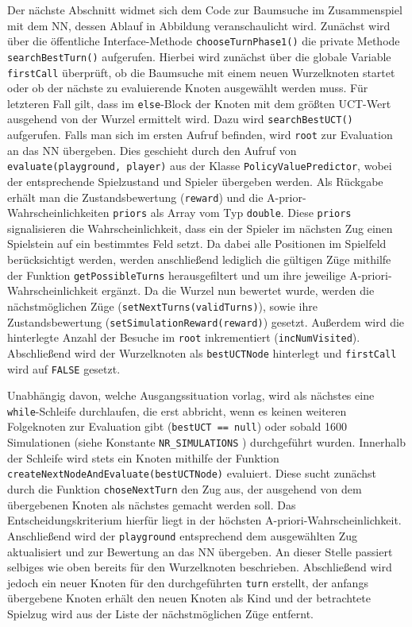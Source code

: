\documentclass[12pt,a4paper]{article}
\begin{document}
Der nächste Abschnitt widmet sich dem Code zur Baumsuche im Zusammenspiel mit dem NN, dessen Ablauf in Abbildung veranschaulicht wird. Zunächst wird über die öffentliche Interface-Methode \texttt{chooseTurnPhase1()} die private Methode \texttt{searchBestTurn()} aufgerufen. Hierbei wird zunächst über die globale Variable \texttt{firstCall} überprüft, ob die Baumsuche mit einem neuen Wurzelknoten startet oder ob der nächste zu evaluierende Knoten ausgewählt werden muss. Für letzteren Fall gilt, dass im \texttt{else}-Block der Knoten mit dem größten UCT-Wert ausgehend von der Wurzel ermittelt wird. Dazu wird \texttt{searchBestUCT()} aufgerufen. Falls man sich im ersten Aufruf befinden, wird \texttt{root} zur Evaluation an das NN übergeben. Dies geschieht durch den Aufruf von \texttt{evaluate(playground, player)} aus der Klasse \texttt{PolicyValuePredictor}, wobei der entsprechende Spielzustand und Spieler übergeben werden. Als Rückgabe erhält man die Zustandsbewertung (\texttt{reward}) und die A-prior-Wahrscheinlichkeiten \texttt{priors} als Array vom Typ \texttt{double}. Diese \texttt{priors} signalisieren die Wahrscheinlichkeit, dass ein der Spieler im nächsten Zug einen Spielstein auf ein bestimmtes Feld setzt. Da dabei alle Positionen im Spielfeld berücksichtigt werden, werden anschließend lediglich die gültigen Züge mithilfe der Funktion \texttt{getPossibleTurns} herausgefiltert und um ihre jeweilige A-priori-Wahrscheinlichkeit ergänzt. Da die Wurzel nun bewertet wurde, werden die nächstmöglichen Züge (\texttt{setNextTurns(validTurns)}), sowie ihre Zustandsbewertung (\texttt{setSimulationReward(reward)}) gesetzt. Außerdem wird die hinterlegte Anzahl der Besuche im \texttt{root} inkrementiert (\texttt{incNumVisited}). Abschließend wird der Wurzelknoten als \texttt{bestUCTNode} hinterlegt und \texttt{firstCall} wird auf \texttt{FALSE} gesetzt. 

Unabhängig davon, welche Ausgangssituation vorlag, wird als nächstes eine \texttt{while}-Schleife durchlaufen, die erst abbricht, wenn es keinen weiteren Folgeknoten zur Evaluation gibt (\texttt{bestUCT == null}) oder sobald 1600 Simulationen (siehe Konstante \texttt{NR\_SIMULATIONS} ) durchgeführt wurden. Innerhalb der Schleife wird stets ein Knoten mithilfe der Funktion \texttt{createNextNodeAndEvaluate(bestUCTNode)} evaluiert. Diese sucht zunächst durch die Funktion \texttt{choseNextTurn} den Zug aus, der ausgehend von dem übergebenen Knoten als nächstes gemacht werden soll. Das Entscheidungskriterium hierfür liegt in der höchsten A-priori-Wahrscheinlichkeit. Anschließend wird der \texttt{playground} entsprechend dem ausgewählten Zug aktualisiert und zur Bewertung an das NN übergeben. An dieser Stelle passiert selbiges wie oben bereits für den Wurzelknoten beschrieben. Abschließend wird jedoch ein neuer Knoten für den durchgeführten \texttt{turn} erstellt, der anfangs übergebene Knoten erhält den neuen Knoten als Kind und der betrachtete Spielzug wird aus der Liste der nächstmöglichen Züge entfernt.
\end{document}
